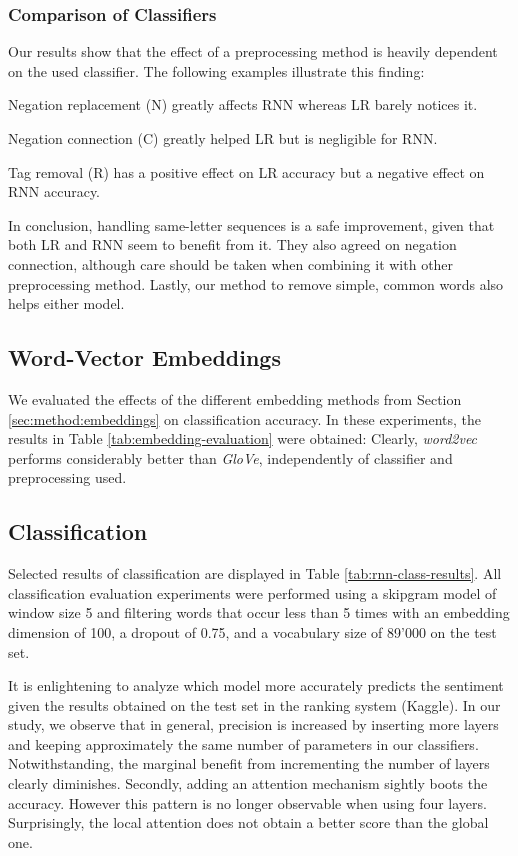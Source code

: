 \subsubsection{Comparison of Classifiers}

Our results show that the effect of a preprocessing method is heavily dependent on the used classifier. The following examples illustrate this finding:
\begin{compactitem}
	\item Negation replacement (N) greatly affects RNN whereas LR barely notices it.
	\item Negation connection (C) greatly helped LR but is negligible for RNN.
	\item Tag removal (R) has a positive effect on LR accuracy but a negative effect on RNN accuracy.
\end{compactitem}

In conclusion, handling same-letter sequences is a safe improvement, given that both LR and RNN seem to benefit from it. They also agreed on negation connection, although care should be taken when combining it with other preprocessing method. Lastly, our method to remove simple, common words also helps either model.

\subsection{Word-Vector Embeddings}

We evaluated the effects of the different embedding methods from Section \ref{sec:method:embeddings} on classification accuracy. In these experiments, the results in Table \ref{tab:embedding-evaluation} were obtained: Clearly, \textit{word2vec} performs considerably better than \textit{GloVe}, independently of classifier and preprocessing used.
\subsection{Classification}

Selected results of classification are displayed in Table \ref{tab:rnn-class-results}. All classification evaluation experiments were performed using a skipgram model of window size 5 and filtering words that occur less than 5 times with an embedding dimension of 100, a dropout of 0.75, and a vocabulary size of 89'000 on the test set.

It is enlightening to analyze which model more accurately predicts the sentiment given the results obtained on the test set in the ranking system (Kaggle). In our study, we observe that in general, precision is increased by inserting more layers and keeping approximately the same number of parameters in our classifiers. Notwithstanding, the marginal benefit from incrementing the number of layers clearly diminishes. Secondly, adding an attention mechanism sightly boots the accuracy. However this pattern is no longer observable when using four layers. Surprisingly, the local attention does not obtain a better score than the global one. 
